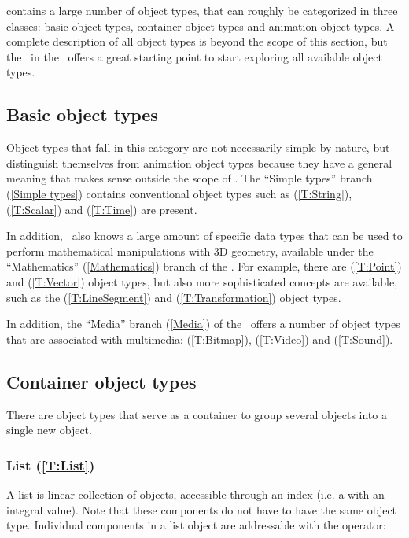 
\scriptlang contains a large number of object types, that can roughly be categorized in three classes: basic object types, container object types and animation object types. A complete description of all object types is beyond the scope of this section, but the \functionspanel\ in the \sourcewin\ offers a great starting point to start exploring all available object types.

\subsection{Basic object types}
Object types that fall in this category are not necessarily simple by nature, but distinguish themselves from animation object types because they have a general meaning that makes sense outside the scope of \softwarename. The ``Simple types'' branch (\ref{Simple types}) contains conventional object types such as  (\ref{T:String}),  (\ref{T:Scalar}) and  (\ref{T:Time}) are present.

In addition, \scriptlang\ also knows a large amount of specific data types that can be used to perform mathematical manipulations with 3D geometry, available under the ``Mathematics'' (\ref{Mathematics}) branch of the \functionspanel. For example, there are  (\ref{T:Point}) and  (\ref{T:Vector}) object types, but also more sophisticated concepts are available, such as the  (\ref{T:LineSegment}) and  (\ref{T:Transformation}) object types.

In addition, the ``Media'' branch (\ref{Media}) of the \functionspanel\ offers a number of object types that are associated with multimedia:  (\ref{T:Bitmap}),  (\ref{T:Video}) and  (\ref{T:Sound}).

\subsection{Container object types}
There are object types that serve as a container to group several objects into a single new object.
\subsubsection{List (\ref{T:List})}
A list is linear collection of objects, accessible through an index (i.e. a  with an integral value). Note that these components do not have to have the same object type. Individual components in a list object are addressable with the \sourcecode{()} operator:

